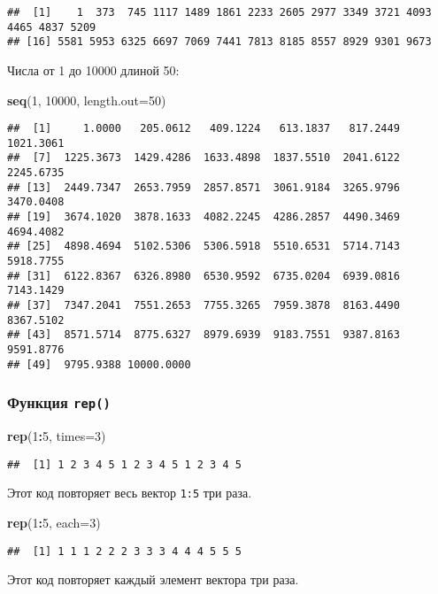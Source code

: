 \documentclass[
]{article}
\newenvironment{Shaded}{\begin{snugshade}}{\end{snugshade}}
\newcommand{\AttributeTok}[1]{\textcolor[rgb]{0.13,0.29,0.53}{#1}}
\newcommand{\DecValTok}[1]{\textcolor[rgb]{0.00,0.00,0.81}{#1}}
\newcommand{\FunctionTok}[1]{\textcolor[rgb]{0.13,0.29,0.53}{\textbf{#1}}}
\newcommand{\NormalTok}[1]{#1}
\newcommand{\SpecialCharTok}[1]{\textcolor[rgb]{0.81,0.36,0.00}{\textbf{#1}}}
\begin{document}
\begin{verbatim}
##  [1]    1  373  745 1117 1489 1861 2233 2605 2977 3349 3721 4093 4465 4837 5209
## [16] 5581 5953 6325 6697 7069 7441 7813 8185 8557 8929 9301 9673
\end{verbatim}

Числа от 1 до 10000 длиной 50:

\begin{Shaded}
\begin{Highlighting}[]
\FunctionTok{seq}\NormalTok{(}\DecValTok{1}\NormalTok{, }\DecValTok{10000}\NormalTok{, }\AttributeTok{length.out=}\DecValTok{50}\NormalTok{)}
\end{Highlighting}
\end{Shaded}

\begin{verbatim}
##  [1]     1.0000   205.0612   409.1224   613.1837   817.2449  1021.3061
##  [7]  1225.3673  1429.4286  1633.4898  1837.5510  2041.6122  2245.6735
## [13]  2449.7347  2653.7959  2857.8571  3061.9184  3265.9796  3470.0408
## [19]  3674.1020  3878.1633  4082.2245  4286.2857  4490.3469  4694.4082
## [25]  4898.4694  5102.5306  5306.5918  5510.6531  5714.7143  5918.7755
## [31]  6122.8367  6326.8980  6530.9592  6735.0204  6939.0816  7143.1429
## [37]  7347.2041  7551.2653  7755.3265  7959.3878  8163.4490  8367.5102
## [43]  8571.5714  8775.6327  8979.6939  9183.7551  9387.8163  9591.8776
## [49]  9795.9388 10000.0000
\end{verbatim}

\subsubsection{\texorpdfstring{Функция
\texttt{rep()}}{Функция rep()}}\label{ux444ux443ux43dux43aux446ux438ux44f-rep}

\begin{Shaded}
\begin{Highlighting}[]
\FunctionTok{rep}\NormalTok{(}\DecValTok{1}\SpecialCharTok{:}\DecValTok{5}\NormalTok{, }\AttributeTok{times=}\DecValTok{3}\NormalTok{)}
\end{Highlighting}
\end{Shaded}

\begin{verbatim}
##  [1] 1 2 3 4 5 1 2 3 4 5 1 2 3 4 5
\end{verbatim}

Этот код повторяет весь вектор \texttt{1:5} три раза.

\begin{Shaded}
\begin{Highlighting}[]
\FunctionTok{rep}\NormalTok{(}\DecValTok{1}\SpecialCharTok{:}\DecValTok{5}\NormalTok{, }\AttributeTok{each=}\DecValTok{3}\NormalTok{)}
\end{Highlighting}
\end{Shaded}

\begin{verbatim}
##  [1] 1 1 1 2 2 2 3 3 3 4 4 4 5 5 5
\end{verbatim}

Этот код повторяет каждый элемент вектора три раза.
\end{document}
